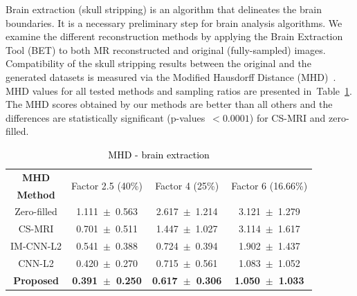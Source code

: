 \documentclass[10pt,journal,compsoc]{IEEEtran}
\begin{document}
Brain extraction (skull stripping) is an algorithm that delineates the brain boundaries. It is a necessary preliminary step for brain analysis algorithms.
We examine the different reconstruction methods by applying the Brain Extraction Tool (BET) \cite{smith2002fast} to both MR reconstructed and original (fully-sampled) images. Compatibility of the skull stripping results between the original and the generated datasets is measured via the Modified Hausdorff Distance (MHD)~\cite{dubuisson1994modified}. 
%
%
%
MHD values for all tested methods and sampling ratios are presented in~Table~\ref{tbl:MHD}. The MHD scores obtained by our methods are better than all others and the differences are statistically significant (p-values~$<0.0001$) for CS-MRI and zero-filled.

\begin{table}[ht]
	\centering{}
	\begin{tabular}{|c||c||c||c|}
		\hline 
		\textbf{MHD} & \multicolumn{1}{c||}{\multirow{2}{*}{Factor 2.5 (40\%)}} & \multicolumn{1}{c||}{\multirow{2}{*}{Factor 4 (25\%)}} & \multicolumn{1}{c|}{\multirow{2}{*}{Factor 6 (16.66\%)}} \tabularnewline
		\textbf{Method} & \multicolumn{1}{c||}{} & \multicolumn{1}{c||}{} & \multicolumn{1}{c|}{} \tabularnewline \cline{1-4}
				
		Zero-filled         &1.111~$\pm$~0.563  &2.617~$\pm$~1.214   &3.121~$\pm$~1.279\tabularnewline
		CS-MRI              &0.701~$\pm$~0.511  &1.447~$\pm$~1.027   &3.114~$\pm$~1.617\tabularnewline
		IM-CNN-L2           &0.541~$\pm$~0.388  &0.724~$\pm$~0.394   &1.902~$\pm$~1.437\tabularnewline
		CNN-L2              &0.420~$\pm$~0.270  &0.715~$\pm$~0.561   &1.083~$\pm$~1.052\tabularnewline
		\textbf{Proposed}   &\textbf{0.391~$\pm$~0.250}  &\textbf{0.617~$\pm$~0.306}   &\textbf{1.050~$\pm$~1.033}\tabularnewline
		\hline 
	\end{tabular}\caption{\textcolor{black}{\footnotesize{}{}MHD - brain extraction}{\footnotesize{}\label{tbl:MHD}}}
\end{table}
\end{document}
